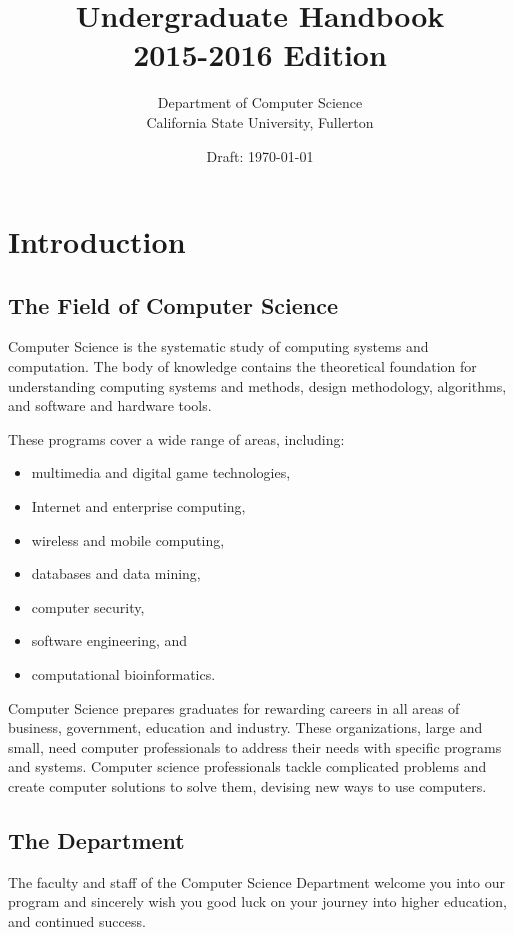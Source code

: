 \documentclass{book}
\begin{document}
\title{Undergraduate Handbook \\ 2015-2016 Edition}
\author{Department of Computer Science \\ California State University, Fullerton}
\date{Draft: \today}
\maketitle

\newpage
\tableofcontents

\chapter{Introduction}

\section{The Field of Computer Science}
Computer Science is the systematic study of computing systems and computation. The body of knowledge contains the theoretical foundation for understanding computing systems and methods, design methodology, algorithms, and software and hardware tools.

These programs cover a wide range of areas, including:
\begin{itemize}
\item multimedia and digital game technologies,
\item Internet and enterprise computing,
\item wireless and mobile computing,
\item databases and data mining,
\item computer security,
\item software engineering, and
\item computational bioinformatics.
\end{itemize}

Computer Science prepares graduates for rewarding careers in all areas of business, government, education and industry. These organizations, large and small, need computer professionals to address their needs with specific programs and systems. Computer science professionals tackle complicated problems and create computer solutions to solve them, devising new ways to use computers.

\section{The Department}
\label{section:the_department}
The faculty and staff of the Computer Science Department welcome you into our program and sincerely wish you good luck on your journey into higher education, and continued success.
\end{document}
